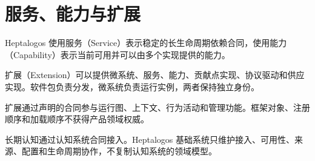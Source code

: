 \chapter{服务、能力与扩展}

Heptalogos 使用服务（Service）表示稳定的长生命周期依赖合同，使用能力（Capability）表示当前可用并可以由多个实现提供的能力。

扩展（Extension）可以提供微系统、服务、能力、贡献点实现、协议驱动和供应实现。软件包负责分发，微系统负责运行实例，两者保持独立身份。

扩展通过声明的合同参与运行图、上下文、行为活动和管理功能。框架对象、注册顺序和加载顺序不获得产品领域权威。

长期认知通过认知系统合同接入。Heptalogos 基础系统只维护接入、可用性、来源、配置和生命周期协作，不复制认知系统的领域模型。
